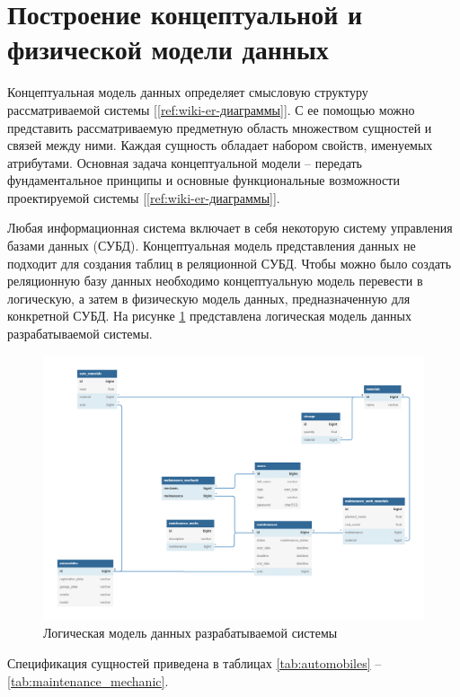 \documentclass[../nirs.tex]{subfiles}
\begin{document}
\section{Построение концептуальной и физической модели данных}
Концептуальная модель данных определяет смысловую структуру рассматриваемой
системы [\ref{ref:wiki-er-диаграммы}]. С ее помощью можно представить рассматриваемую предметную область
множеством сущностей и связей между ними. Каждая сущность обладает набором
свойств, именуемых атрибутами. Основная задача концептуальной модели -- передать
фундаментальное принципы и основные функциональные возможности проектируемой
системы [\ref{ref:wiki-er-диаграммы}].

Любая информационная система включает в себя некоторую систему управления базами
данных (СУБД). Концептуальная модель представления данных не подходит для
создания таблиц в реляционной СУБД. Чтобы можно было создать реляционную базу
данных необходимо концептуальную модель перевести в логическую, а затем в
физическую  модель данных, предназначенную для конкретной СУБД. На рисунке
\ref{fig:3_1_db_logical} представлена логическая модель данных разрабатываемой
системы.

\clearpage
\begin{landscape}

\begin{figure}[H]
	\centering
	\includegraphics[keepaspectratio,width=\paperwidth]{./images/3_1_db_logical.png}
	\caption{Логическая модель данных разрабатываемой системы}
	\label{fig:3_1_db_logical}
\end{figure}

\end{landscape}
\clearpage

Спецификация сущностей приведена в таблицах \ref{tab:automobiles} --
\ref{tab:maintenance_mechanic}.









\end{document}
